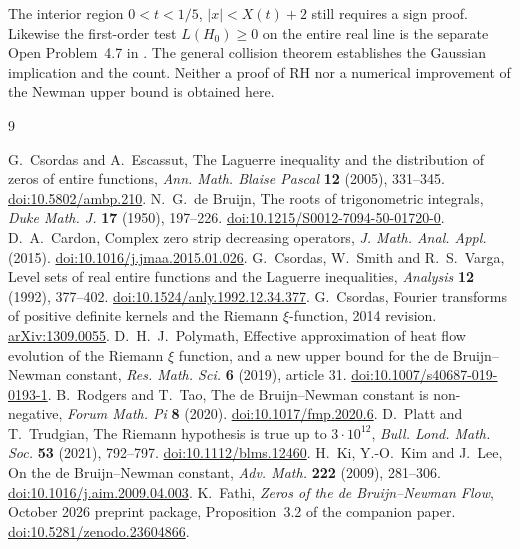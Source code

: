 \documentclass[11pt,a4paper]{article}
\numberwithin{equation}{section}
\begin{document}
The interior region $0<t<1/5$, $|x|<X(t)+2$ still requires a sign proof.
Likewise the first-order test $L(H_0)\ge0$ on the entire real line
is the separate Open Problem~4.7 in \cite{Cs14}. The general collision
theorem establishes the Gaussian implication and the count. Neither
a proof of RH nor a numerical improvement of the Newman upper bound
is obtained here.

\begin{thebibliography}{9}\raggedright
{} G.~Csordas and A.~Escassut,
The Laguerre inequality and the distribution of zeros of entire functions,
\emph{Ann. Math. Blaise Pascal} \textbf{12} (2005), 331--345.
\href{https://doi.org/10.5802/ambp.210}{doi:10.5802/ambp.210}.
 N.~G.~de Bruijn, The roots of trigonometric integrals,
\emph{Duke Math. J.} \textbf{17} (1950), 197--226.
\href{https://doi.org/10.1215/S0012-7094-50-01720-0}{doi:10.1215/S0012-7094-50-01720-0}.
 D.~A.~Cardon, Complex zero strip decreasing operators,
\emph{J. Math. Anal. Appl.} (2015).
\href{https://doi.org/10.1016/j.jmaa.2015.01.026}{doi:10.1016/j.jmaa.2015.01.026}.
 G.~Csordas, W.~Smith and R.~S.~Varga,
Level sets of real entire functions and the Laguerre inequalities,
\emph{Analysis} \textbf{12} (1992), 377--402.
\href{https://doi.org/10.1524/anly.1992.12.34.377}{doi:10.1524/anly.1992.12.34.377}.
 G.~Csordas, Fourier transforms of positive definite kernels
and the Riemann $\xi$-function, 2014 revision.
\href{https://arxiv.org/abs/1309.0055}{arXiv:1309.0055}.
 D.~H.~J.~Polymath, Effective approximation of heat flow
evolution of the Riemann $\xi$ function, and a new upper bound for the
de Bruijn--Newman constant, \emph{Res. Math. Sci.} \textbf{6} (2019), article 31.
\href{https://doi.org/10.1007/s40687-019-0193-1}{doi:10.1007/s40687-019-0193-1}.
 B.~Rodgers and T.~Tao, The de Bruijn--Newman constant is
non-negative, \emph{Forum Math. Pi} \textbf{8} (2020).
\href{https://doi.org/10.1017/fmp.2020.6}{doi:10.1017/fmp.2020.6}.
 D.~Platt and T.~Trudgian, The Riemann hypothesis is true up to
$3\cdot10^{12}$, \emph{Bull. Lond. Math. Soc.} \textbf{53} (2021), 792--797.
\href{https://doi.org/10.1112/blms.12460}{doi:10.1112/blms.12460}.
 H.~Ki, Y.-O.~Kim and J.~Lee, On the de Bruijn--Newman
constant, \emph{Adv. Math.} \textbf{222} (2009), 281--306.
\href{https://doi.org/10.1016/j.aim.2009.04.003}{doi:10.1016/j.aim.2009.04.003}.
 K.~Fathi, \emph{Zeros of the de Bruijn--Newman Flow},
October 2026 preprint package, Proposition~3.2 of the companion paper.
\href{https://doi.org/10.5281/zenodo.23604866}{doi:10.5281/zenodo.23604866}.
\end{thebibliography}
\end{document}
